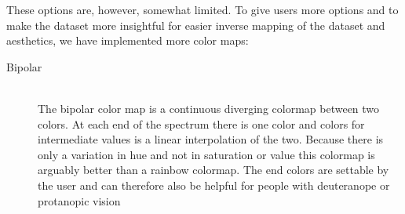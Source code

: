 		\clearpage
		These options are, however, somewhat limited. 
		To give users more options and to make the dataset more insightful for easier inverse mapping of the dataset and aesthetics, we have implemented more color maps:
		\begin{description}
			\item[Bipolar] ~\\
			The bipolar color map is a continuous diverging colormap between two colors. 
			At each end of the spectrum there is one color and colors for intermediate values is a linear interpolation of the two. 
			Because there is only a variation in hue and not in saturation or value this colormap is arguably better than a rainbow colormap.
			The end colors are settable by the user and can therefore also be helpful for people with deuteranope or protanopic vision\cite{moreland2009diverging}
			\begin{figure}[htb]
			  \centering

\end{figure}
\end{description}
